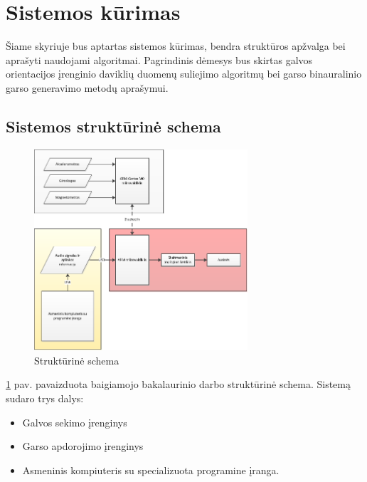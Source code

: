 \documentclass[]{vgtuef}
\begin{document}
\section{Sistemos kūrimas}

Šiame skyriuje bus aptartas sistemos kūrimas, bendra struktūros apžvalga bei aprašyti naudojami algoritmai. Pagrindinis dėmesys bus skirtas galvos orientacijos įrenginio daviklių duomenų suliejimo algoritmų bei garso binauralinio garso generavimo metodų aprašymui.

\subsection{Sistemos struktūrinė schema}

\begin{figure}[!h]
  \centering
  \includegraphics[width=300px]{img/schema.png}
  \caption{Struktūrinė schema}
  \label{fig:full_schematic}
\end{figure}

\ref{fig:full_schematic} pav. pavaizduota baigiamojo bakalaurinio darbo struktūrinė schema. Sistemą sudaro trys dalys:

\begin{itemize}
\item Galvos sekimo įrenginys
\item Garso apdorojimo įrenginys
\item Asmeninis kompiuteris su specializuota programine įranga.
\end{itemize}
\end{document}

